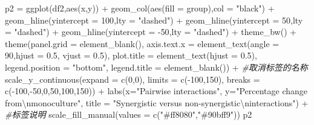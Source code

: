 \documentclass[
]{book}
\newenvironment{Shaded}{\begin{snugshade}}{\end{snugshade}}
\newcommand{\AttributeTok}[1]{\textcolor[rgb]{0.77,0.63,0.00}{#1}}
\newcommand{\CommentTok}[1]{\textcolor[rgb]{0.56,0.35,0.01}{\textit{#1}}}
\newcommand{\DecValTok}[1]{\textcolor[rgb]{0.00,0.00,0.81}{#1}}
\newcommand{\FloatTok}[1]{\textcolor[rgb]{0.00,0.00,0.81}{#1}}
\newcommand{\FunctionTok}[1]{\textcolor[rgb]{0.00,0.00,0.00}{#1}}
\newcommand{\NormalTok}[1]{#1}
\newcommand{\OtherTok}[1]{\textcolor[rgb]{0.56,0.35,0.01}{#1}}
\newcommand{\SpecialCharTok}[1]{\textcolor[rgb]{0.00,0.00,0.00}{#1}}
\newcommand{\StringTok}[1]{\textcolor[rgb]{0.31,0.60,0.02}{#1}}
\begin{document}
\begin{Shaded}
\begin{Highlighting}[]
\NormalTok{p2 }\OtherTok{=} \FunctionTok{ggplot}\NormalTok{(df2,}\FunctionTok{aes}\NormalTok{(x,y)) }\SpecialCharTok{+} 
  \FunctionTok{geom\_col}\NormalTok{(}\FunctionTok{aes}\NormalTok{(}\AttributeTok{fill =}\NormalTok{ group),}\AttributeTok{col =} \StringTok{"black"}\NormalTok{) }\SpecialCharTok{+} 
  \FunctionTok{geom\_hline}\NormalTok{(}\AttributeTok{yintercept =} \DecValTok{100}\NormalTok{,}\AttributeTok{lty =} \StringTok{"dashed"}\NormalTok{) }\SpecialCharTok{+}
  \FunctionTok{geom\_hline}\NormalTok{(}\AttributeTok{yintercept =} \DecValTok{50}\NormalTok{,}\AttributeTok{lty =} \StringTok{"dashed"}\NormalTok{) }\SpecialCharTok{+}
  \FunctionTok{geom\_hline}\NormalTok{(}\AttributeTok{yintercept =} \SpecialCharTok{{-}}\DecValTok{50}\NormalTok{,}\AttributeTok{lty =} \StringTok{"dashed"}\NormalTok{) }\SpecialCharTok{+}
  \FunctionTok{theme\_bw}\NormalTok{() }\SpecialCharTok{+}
  \FunctionTok{theme}\NormalTok{(}\AttributeTok{panel.grid =} \FunctionTok{element\_blank}\NormalTok{(),}
        \AttributeTok{axis.text.x =} \FunctionTok{element\_text}\NormalTok{(}\AttributeTok{angle =} \DecValTok{90}\NormalTok{,}\AttributeTok{hjust =} \FloatTok{0.5}\NormalTok{,}
                                   \AttributeTok{vjust =} \FloatTok{0.5}\NormalTok{),}
        \AttributeTok{plot.title =} \FunctionTok{element\_text}\NormalTok{(}\AttributeTok{hjust =} \FloatTok{0.5}\NormalTok{),}
        \AttributeTok{legend.position =} \StringTok{"bottom"}\NormalTok{,}
        \AttributeTok{legend.title =} \FunctionTok{element\_blank}\NormalTok{()) }\SpecialCharTok{+} \CommentTok{\#取消标签的名称}
  \FunctionTok{scale\_y\_continuous}\NormalTok{(}\AttributeTok{expand =} \FunctionTok{c}\NormalTok{(}\DecValTok{0}\NormalTok{,}\DecValTok{0}\NormalTok{),}
                     \AttributeTok{limits =} \FunctionTok{c}\NormalTok{(}\SpecialCharTok{{-}}\DecValTok{100}\NormalTok{,}\DecValTok{150}\NormalTok{),}
                     \AttributeTok{breaks =} \FunctionTok{c}\NormalTok{(}\SpecialCharTok{{-}}\DecValTok{100}\NormalTok{,}\SpecialCharTok{{-}}\DecValTok{50}\NormalTok{,}\DecValTok{0}\NormalTok{,}\DecValTok{50}\NormalTok{,}\DecValTok{100}\NormalTok{,}\DecValTok{150}\NormalTok{)) }\SpecialCharTok{+}
  \FunctionTok{labs}\NormalTok{(}\AttributeTok{x=}\StringTok{"Pairwise interactions"}\NormalTok{,}
       \AttributeTok{y=}\StringTok{"Percentage change from}\SpecialCharTok{\textbackslash{}n}\StringTok{monoculture"}\NormalTok{,}
       \AttributeTok{title =} \StringTok{"Synergistic versus non{-}synergistic}\SpecialCharTok{\textbackslash{}n}\StringTok{interactions"}\NormalTok{) }\SpecialCharTok{+} \CommentTok{\#标签说明}
  \FunctionTok{scale\_fill\_manual}\NormalTok{(}\AttributeTok{values =} \FunctionTok{c}\NormalTok{(}\StringTok{"\#ff8080"}\NormalTok{,}\StringTok{"\#90bff9"}\NormalTok{))}
\NormalTok{p2  }
\end{Highlighting}
\end{Shaded}
\end{document}
